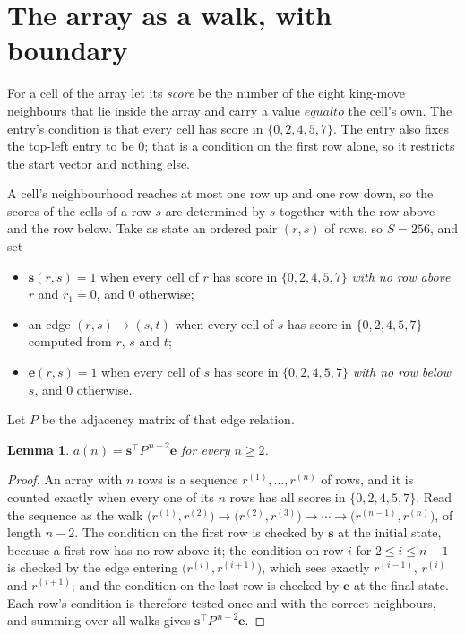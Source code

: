 \documentclass[11pt,a4paper]{article}
\theoremstyle{plain}
\newtheorem{lemma}[theorem]{Lemma}
\theoremstyle{definition}
\begin{document}
\section{The array as a walk, with boundary}

For a cell of the array let its \emph{score} be the number of the eight king-move neighbours that lie inside
the array and carry a value $equal to$ the cell's own. The entry's condition is that every cell
has score in $\{0,2,4,5,7\}$. The entry also fixes the top-left entry to be $0$; that is a condition on the first row alone, so it restricts the start vector and nothing else.

A cell's neighbourhood reaches at most one row up and one row down, so the scores of the
cells of a row $s$ are determined by $s$ together with the row above and the row below.
Take as state an ordered pair $(r,s)$ of rows, so $S=256$, and set
\begin{itemize}
\item $\mathbf{s}(r,s)=1$ when every cell of $r$ has score in $\{0,2,4,5,7\}$ \emph{with no row
above $r$} and $r_1=0$, and $0$ otherwise;
\item an edge $(r,s)\to(s,t)$ when every cell of $s$ has score in $\{0,2,4,5,7\}$ computed from
$r$, $s$ and $t$;
\item $\mathbf{e}(r,s)=1$ when every cell of $s$ has score in $\{0,2,4,5,7\}$ \emph{with no row
below $s$}, and $0$ otherwise.
\end{itemize}
Let $P$ be the adjacency matrix of that edge relation.

\begin{lemma}\label{lem:walk}
$a(n)=\mathbf{s}^{\!\top}P^{\,n-2}\mathbf{e}$ for every $n\ge2$.
\end{lemma}

\begin{proof}
An array with $n$ rows is a sequence $r^{(1)},\dots,r^{(n)}$ of rows, and it is counted
exactly when every one of its $n$ rows has all scores in $\{0,2,4,5,7\}$. Read the sequence as the
walk $\bigl(r^{(1)},r^{(2)}\bigr)\to\bigl(r^{(2)},r^{(3)}\bigr)\to\cdots\to
\bigl(r^{(n-1)},r^{(n)}\bigr)$, of length $n-2$. The condition on the first row is
checked by $\mathbf{s}$ at the initial state, because a first row has no row above it; the
condition on row $i$ for $2\le i\le n-1$ is checked by the edge entering
$\bigl(r^{(i)},r^{(i+1)}\bigr)$, which sees exactly $r^{(i-1)}$, $r^{(i)}$ and
$r^{(i+1)}$; and the condition on the last row is checked by $\mathbf{e}$ at the final
state. Each row's condition is therefore tested once and with the correct neighbours, and
summing over all walks gives $\mathbf{s}^{\!\top}P^{\,n-2}\mathbf{e}$.
\end{proof}
\end{document}
